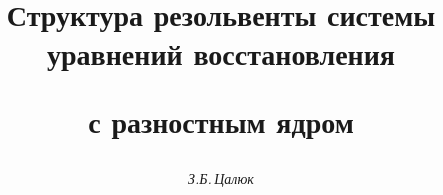 




%


\newcommand{\re}{\operatorname{Re}}


\newcommand{\rank}{\operatorname{rank}}


\newcommand{\tts}[1]{}


\renewcommand{\baselinestretch}{1.1}







\setcounter{page}{71}















\author{\it З.Б.\,Цалюк}




\title{Структура резольвенты системы уравнений восстановления


с разностным ядром}





\date{}




\pagestyle{plain} %







\maketitle


\label{begin}





